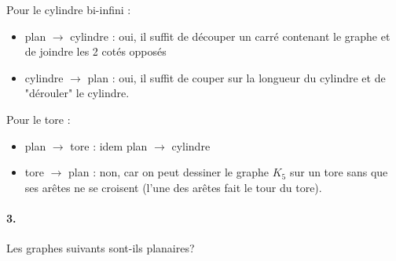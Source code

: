 \begin{solution}
Pour le cylindre bi-infini : 
\begin{itemize}
\item plan $\longrightarrow$ cylindre : oui, il suffit de découper un carré contenant le graphe et de joindre les 2 cotés opposés
\item cylindre $\longrightarrow$ plan : oui, il suffit de couper sur la longueur du cylindre et de "dérouler" le cylindre. \\
\end{itemize}

Pour le tore : 
\begin{itemize}
\item plan $\longrightarrow$ tore : idem plan $\longrightarrow$ cylindre
\item tore $\longrightarrow$ plan : non, car on peut dessiner le graphe $K_5$ sur un tore sans que ses arêtes ne se croisent (l'une des arêtes fait le tour du tore).
\end{itemize}
\end{solution}

\paragraph{3. } Les graphes suivants sont-ils planaires?

